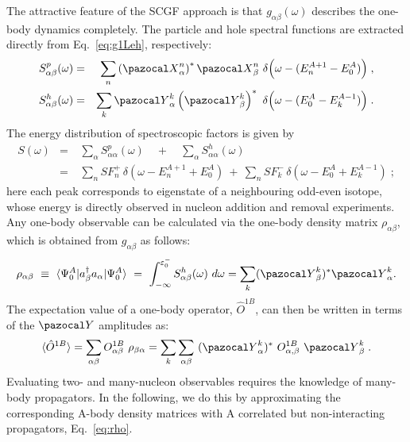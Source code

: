 The attractive feature of the SCGF approach is that $g_{\alpha\beta}(\omega)$ describes the one-body dynamics completely. The particle and hole spectral functions are extracted directly from Eq.~\eqref{eq:g1Leh}, respectively:
 \begin{eqnarray}
\nonumber 
S^{p}_{\alpha \beta}(\omega)&=&\sum_{n} \left({\pazocal X}^n_\alpha \right)^*  {\pazocal X}^n_\beta ~ \delta\Big(\omega-(E^{A+1}_n - E^A_0)\Big) \; ,
\\
 \label{eq:SpSh}
S^{h}_{\alpha \beta}(\omega)&=&\sum_{k}  {\pazocal Y}^k_\alpha  \left({\pazocal Y}^k_\beta \right)^* ~\delta\Big(\omega-(E^A_0 - E^{A-1}_k)\Big) \; .
\end{eqnarray} 
The energy distribution of spectroscopic factors is given by
\begin{eqnarray}
  S(\omega) &=& ~ \sum_\alpha S^p_{\alpha \alpha}(\omega) \quad + \quad \sum_\alpha S^h_{\alpha \alpha}(\omega)  \nonumber \\
          &=& ~ \sum_n  SF_n^+ \, \delta( \omega - E^{A+1}_n + E^A_0) 
          ~+~  \sum_n  SF_k^- \, \delta( \omega - E^A_0 + E^{A-1}_k ) \; ;
\label{eq:SFvsE}
\end{eqnarray}
here each peak corresponds to eigenstate of a neighbouring odd-even isotope, whose energy is directly observed in nucleon addition and removal experiments.
Any one-body observable can be calculated via the one-body density matrix $\rho_{\alpha\beta}$, which is obtained from $g_{\alpha\beta}$ as follows:
\begin{equation}
  \label{eq:rho}
  \rho_{\alpha \beta} ~\equiv ~ \langle\Psi_0^A\vert a^{\dag}_{\beta}a_{\alpha} \vert\Psi_0^A\rangle\nonumber\\
  ~=~  \int_{-\infty}^{\varepsilon^-_0}S^h_{\alpha\beta}(\omega)~d\omega=\sum_k ({\pazocal Y}^k_{\beta})^*{\pazocal Y}^k_{\alpha} .
\end{equation}
The expectation value of a one-body operator, ${\hat O}^{1B}$, can then be written in terms of the ${\pazocal Y}$ amplitudes as:
\begin{equation}
\label{eq:den_one}
\langle {\hat O}^{1B}\rangle  =\sum_{\alpha\beta}  O^{1B}_{\alpha \beta}\,\,\rho_{\beta\alpha}=\sum_k \sum_{\alpha\beta}~ ({\pazocal Y}^k_{\alpha})^*~ O^{1B}_{\alpha,\beta} ~  {\pazocal Y}^k_{\beta} \; .
\end{equation}
Evaluating two- and many-nucleon observables requires the knowledge of many-body propagators. In the following, we do this by approximating the corresponding A-body density matrices with A correlated but non-interacting propagators, Eq.~\eqref{eq:rho}.

